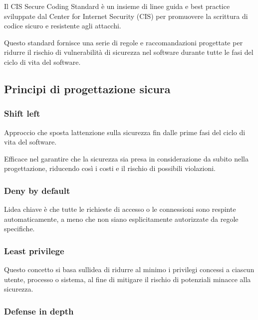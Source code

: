 \documentclass[
]{article}
\begin{document}
{Il CIS Secure Coding Standard è un insieme di linee guida e best
practice sviluppate dal Center for Internet Security (CIS) per
promuovere la scrittura di codice sicuro e resistente agli attacchi. }

{}

{Questo standard fornisce una serie di regole e raccomandazioni
progettate per ridurre il rischio di vulnerabilità di sicurezza nel
software durante tutte le fasi del ciclo di vita del software.}

\subsection{\texorpdfstring{{Principi di progettazione
sicura}}{Principi di progettazione sicura}}\label{h.jjfp3zh6kyhl}

\subsubsection{\texorpdfstring{{Shift
left}}{Shift left}}\label{h.lajlatoo10pr}

{Approccio che sposta l\textquotesingle attenzione sulla sicurezza fin
dalle prime fasi del ciclo di vita del software. }

{}

{Efficace nel garantire che la sicurezza sia presa in considerazione da
subito nella progettazione, riducendo così i costi e il rischio di
possibili violazioni.}

\subsubsection{\texorpdfstring{{Deny by
default}}{Deny by default}}\label{h.rv558efi4lte}

{L\textquotesingle idea chiave è che tutte le richieste di accesso o le
connessioni sono respinte automaticamente, a meno che non siano
esplicitamente autorizzate da regole specifiche. }

\subsubsection{\texorpdfstring{{Least
privilege}}{Least privilege}}\label{h.5hpl0ww07loz}

{Questo concetto si basa sull\textquotesingle idea di ridurre al minimo
i privilegi concessi a ciascun utente, processo o sistema, al fine di
mitigare il rischio di potenziali minacce alla sicurezza. }

\subsubsection{\texorpdfstring{{Defense in
depth}}{Defense in depth}}\label{h.hoa0fjsfxf26}
\end{document}
